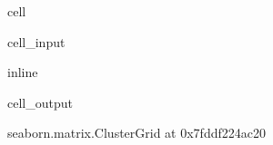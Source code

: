 \documentclass[letterpaper,table,10pt,english]{jupyterBook}
\begin{document}
\begin{sphinxuseclass}{cell}\begin{sphinxVerbatimInput}

\begin{sphinxuseclass}{cell_input}
\begin{sphinxVerbatim}[commandchars=\\\{\}]
 inline
  
\end{sphinxVerbatim}

\end{sphinxuseclass}\end{sphinxVerbatimInput}
\begin{sphinxVerbatimOutput}

\begin{sphinxuseclass}{cell_output}
\begin{sphinxVerbatim}[commandchars=\\\{\}]
\PYGZlt{}seaborn.matrix.ClusterGrid at 0x7fddf224ac20\PYGZgt{}
\end{sphinxVerbatim}

\noindent{}

\end{sphinxuseclass}\end{sphinxVerbatimOutput}

\end{sphinxuseclass}
\sphinxstepscope
\end{document}
